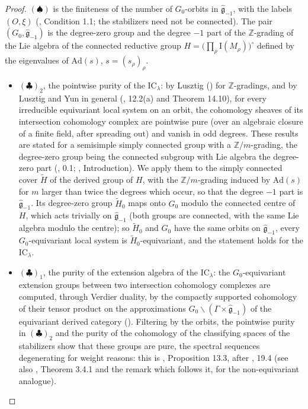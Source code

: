 \documentclass[a4paper,12pt,leqno]{amsart}
\theoremstyle{plain}
\theoremstyle{definition}
\providecommand{\bbZ}{\mathbb{Z}}\providecommand{\bbC}{\mathbb{C}}\providecommand{\Id}{\mathrm{Id}}\providecommand{\Irr}{\mathbf{Irr}}\providecommand{\Alg}{\mathrm{Alg}}
\begin{document}
\begin{proof}
$(\spadesuit)$ is the finiteness of the number of $G_0$-orbits in $\widehat{\mathfrak g}_{-1}$, with
the labels $(O,\xi)$ (\cite{Kat17}, Condition 1.1; the stabilizers need not be connected). The pair
$(G_0,\widehat{\mathfrak g}_{-1})$ is the degree-zero group and the degree $-1$ part of the
$\bbZ$-grading of the Lie algebra of the connected reductive group $H=\big(\prod_\rho\mathrm{I}(M_\rho)
\big)^\circ$ defined by the eigenvalues of $\mathrm{Ad}(s)$, $s=(s_\rho)_\rho$.
\begin{itemize}
\item $(\clubsuit)_2$, the pointwise purity of the $\mathrm{IC}_\lambda$: by Lusztig
(\cite{Lus95b}) for $\bbZ$-gradings, and by Lusztig and Yun in general (\cite{LY17}, 12.2(a) and
Theorem 14.10), for every irreducible equivariant local system on an orbit, the cohomology sheaves of
its intersection cohomology complex are pointwise pure (over an algebraic closure of a finite field,
after spreading out) and vanish in odd degrees. These results are stated for a semisimple simply
connected group with a $\bbZ/m$-grading, the degree-zero group being the connected subgroup with Lie
algebra the degree-zero part (\cite{LY16}, 0.1; \cite{LY17}, Introduction). We apply them to the simply
connected cover $\widetilde H$ of the derived group of $H$, with the $\bbZ/m$-grading induced by
$\mathrm{Ad}(s)$ for $m$ larger than twice the degrees which occur, so that the degree $-1$ part is
$\widehat{\mathfrak g}_{-1}$. Its degree-zero group $\widetilde H_0$ maps onto $G_0$ modulo the connected
centre of $H$, which acts trivially on $\widehat{\mathfrak g}_{-1}$ (both groups are connected, with the
same Lie algebra modulo the centre); so $\widetilde H_0$ and $G_0$ have the same orbits on
$\widehat{\mathfrak g}_{-1}$, every $G_0$-equivariant local system is $\widetilde H_0$-equivariant, and
the statement holds for the $\mathrm{IC}_\lambda$.
\item $(\clubsuit)_1$, the purity of the extension algebra of the $\mathrm{IC}_\lambda$: the
$G_0$-equivariant extension groups between two intersection cohomology complexes are computed, through
Verdier duality, by the compactly supported cohomology of their tensor product on the approximations
$G_0\backslash(\Gamma\times\widehat{\mathfrak g}_{-1})$ of the equivariant derived category
(\cite{BL94}). Filtering by the orbits, the pointwise purity in $(\clubsuit)_2$ and the purity of the
cohomology of the classifying spaces of the stabilizers show that these groups are pure, the spectral
sequences degenerating for weight reasons: this is \cite{LY17}, Proposition 13.3, after \cite{Lus95b},
19.4 (see also \cite{BGS96}, Theorem 3.4.1 and the remark which follows it, for the non-equivariant
analogue).
\end{itemize}
\end{proof}
\end{document}
